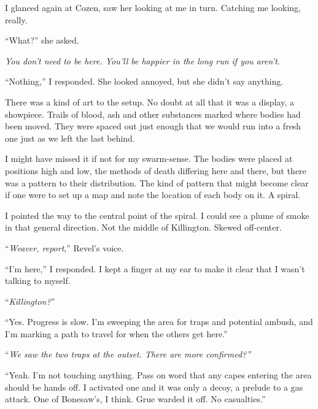 I glanced again at Cozen, saw her looking at me in turn.  Catching me looking, really.



``What?'' she asked.



\emph{You don't need to be here.  You'll be happier in the long run if you aren't}.



``Nothing,'' I responded.  She looked annoyed, but she didn't say anything.



There was a kind of art to the setup.  No doubt at all that it was a display, a showpiece.  Trails of blood, ash and other substances marked where bodies had been moved.  They were spaced out just enough that we would run into a fresh one just as we left the last behind.



I might have missed it if not for my swarm-sense.  The bodies were placed at positions high and low, the methods of death differing here and there, but there was a pattern to their distribution.  The kind of pattern that might become clear if one were to set up a map and note the location of each body on it.  A spiral.



I pointed the way to the central point of the spiral.  I could see a plume of smoke in that general direction.  Not the middle of Killington.  Skewed off-center.



``\emph{Weaver, report},'' Revel's voice.



``I'm here,'' I responded.  I kept a finger at my ear to make it clear that I wasn't talking to myself.



``\emph{Killington?}''



``Yes.  Progress is slow.  I'm sweeping the area for traps and potential ambush, and I'm marking a path to travel for when the others get here.''



``\emph{We saw the two traps at the outset.  There are more confirmed?''}



``Yeah.  I'm not touching anything.  Pass on word that any capes entering the area should be hands off.  I activated one and it was only a decoy, a prelude to a gas attack.  One of Bonesaw's, I think.  Grue warded it off.  No casualties.''




